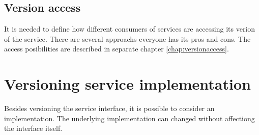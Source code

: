\subsection{Version access}
It is needed to define how different consumers of services are accessing its verion of the service. There are several approachs everyone has its pros and cons. The access posibilities are described in separate chapter \ref{chap:versionaccess}.

\section{Versioning service implementation}
Besides versioning the service interface, it is possible to consider an implementation. The underlying implementation can changed without affectiong the interface itself. 
